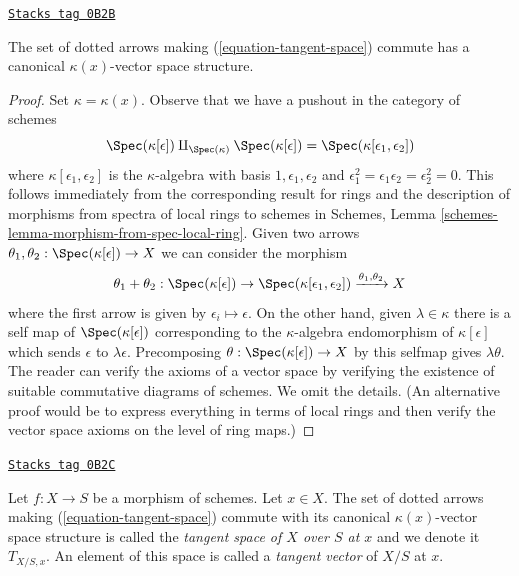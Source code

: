\begin{lemma}
\label{varieties-lemma-tangent-space}
\href{https://stacks.math.columbia.edu/tag/0B2B}{\texttt{Stacks tag 0B2B}}

The set of dotted arrows making (\ref{equation-tangent-space}) commute
has a canonical $\kappa(x)$-vector space structure.
\end{lemma}

\begin{proof}
Set $\kappa = \kappa(x)$. Observe that we have a pushout in the
category of schemes
$$
\Spec(\kappa[\epsilon]) \amalg_{\Spec(\kappa)} \Spec(\kappa[\epsilon])
= \Spec(\kappa[\epsilon_1, \epsilon_2])
$$
where $\kappa[\epsilon_1, \epsilon_2]$ is the $\kappa$-algebra with
basis $1, \epsilon_1, \epsilon_2$ and
$\epsilon_1^2 = \epsilon_1\epsilon_2 = \epsilon_2^2 = 0$.
This follows immediately from the corresponding result for
rings and the description of morphisms from spectra of local rings
to schemes in
Schemes, Lemma \ref{schemes-lemma-morphism-from-spec-local-ring}.
Given two arrows
$\theta_1, \theta_2 : \Spec(\kappa[\epsilon]) \to X$
we can consider the morphism
$$
\theta_1 + \theta_2 :
\Spec(\kappa[\epsilon]) \to
\Spec(\kappa[\epsilon_1, \epsilon_2])
\xrightarrow{\theta_1, \theta_2} X
$$
where the first arrow is given by $\epsilon_i \mapsto \epsilon$.
On the other hand, given $\lambda \in \kappa$ there is a self map
of $\Spec(\kappa[\epsilon])$ corresponding to the $\kappa$-algebra
endomorphism of $\kappa[\epsilon]$ which sends $\epsilon$ to $\lambda \epsilon$.
Precomposing $\theta : \Spec(\kappa[\epsilon]) \to X$
by this selfmap gives $\lambda \theta$. The reader can verify
the axioms of a vector space by verifying the existence
of suitable commutative diagrams of schemes. We omit the details.
(An alternative proof would be to express everything in terms of local
rings and then verify the vector space axioms on the level of ring maps.)
\end{proof}

\begin{definition}
\label{varieties-definition-tangent-space}
\href{https://stacks.math.columbia.edu/tag/0B2C}{\texttt{Stacks tag 0B2C}}

Let $f : X \to S$ be a morphism of schemes. Let $x \in X$. The set of
dotted arrows making (\ref{equation-tangent-space}) commute with
its canonical $\kappa(x)$-vector space structure is called
the {\it tangent space of $X$ over $S$ at $x$} and we denote it $T_{X/S, x}$.
An element of this space is called a {\it tangent vector} of $X/S$ at $x$.
\end{definition}

